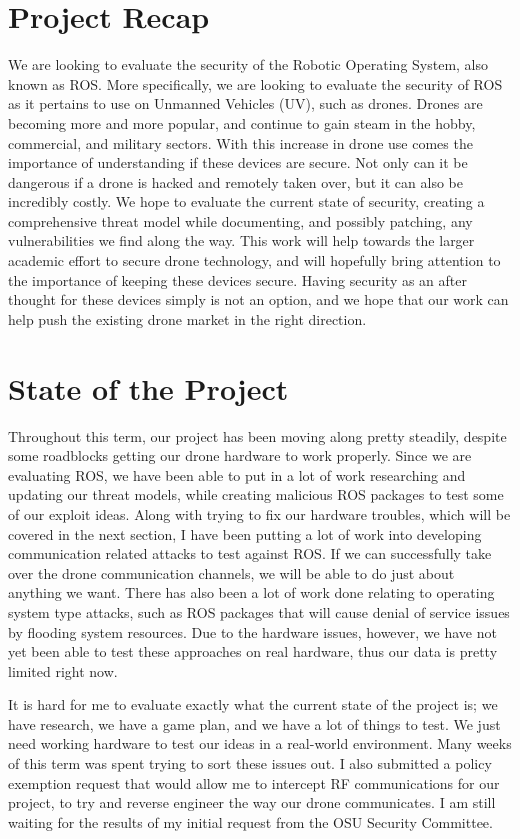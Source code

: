 \documentclass[IEEEtran,letterpaper,10pt,notitlepage,draftclsnofoot,onecolumn]{article}
\begin{document}
\section{Project Recap}
We are looking to evaluate the security of the Robotic Operating System, also known as ROS. More specifically, we are looking to evaluate the security of ROS as it pertains to use on Unmanned Vehicles (UV),
such as drones. Drones are becoming more and more popular, and continue to gain steam in the hobby, commercial, and military sectors. With this increase in drone use comes the importance of understanding if
these devices are secure. Not only can it be dangerous if a drone is hacked and remotely taken over, but
it can also be incredibly costly. We hope to evaluate the current state of security, creating a comprehensive threat model while documenting, and possibly patching, any vulnerabilities we find along the way. This work will help towards the larger academic effort to secure drone technology, and will hopefully
bring attention to the importance of keeping these devices secure. Having security as an after thought for
these devices simply is not an option, and we hope that our work can help push the existing drone market in the right direction.

\section{State of the Project}
Throughout this term, our project has been moving along pretty steadily, despite some roadblocks getting our drone hardware to work properly. Since we are evaluating ROS, we have been able to put in a lot of work
researching and updating our threat models, while creating malicious ROS packages to test some of our exploit ideas. Along with trying to fix our hardware troubles, which will be covered in the next section,
I have been putting a lot of work into developing communication related attacks to test against ROS. If we
can successfully take over the drone communication channels, we will be able to do just about anything we want. There has also been a lot of work done relating to operating system type attacks, such as ROS packages
that will cause denial of service issues by flooding system resources. Due to the hardware issues, however, we have not yet been able to test these approaches on real hardware, thus our data is pretty limited right now.

It is hard for me to evaluate exactly what the current state of the project is; we have research, we have a game plan, and we have a lot of things to test. We just need working hardware to test our ideas in a real-world environment. Many weeks of this term was spent trying to sort these issues out. I also submitted a policy exemption request that would allow me to intercept RF communications for our project, to try and reverse engineer the way our drone communicates. I am still waiting for the results of my initial request from the OSU Security Committee.
\end{document}

